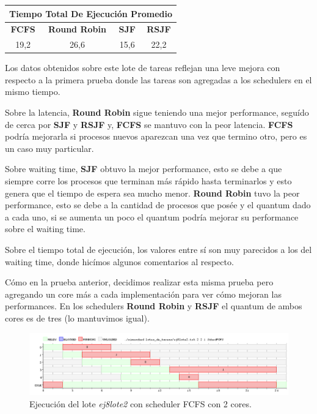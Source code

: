 \begin{center}
	\begin{tabular}{|c|c|c|c|}
		\hline
		\multicolumn{4}{|c|}{\large{\textbf{Tiempo Total De Ejecución Promedio}}} \\
		\hline
		\textbf{FCFS} & \textbf{Round Robin} & \textbf{SJF} & \textbf{RSJF} \\
		\hline
		19,2 & 26,6 & 15,6 & 22,2 \\
		\hline
	\end{tabular}
\end{center}

Los datos obtenidos sobre este lote de tareas reflejan una leve mejora con respecto a la primera prueba donde las tareas son agregadas a los schedulers en el mismo tiempo.

Sobre la latencia, \textbf{Round Robin} sigue teniendo una mejor performance, seguído de cerca por \textbf{SJF} y \textbf{RSJF} y, \textbf{FCFS} se mantuvo con la peor latencia. \textbf{FCFS} podría mejorarla si procesos nuevos aparezcan una vez que termino otro, pero es un caso muy particular.

Sobre waiting time, \textbf{SJF} obtuvo la mejor performance, esto se debe a que siempre corre los procesos que terminan más rápido hasta terminarlos y esto genera que el tiempo de espera sea mucho menor. \textbf{Round Robin} tuvo la peor performance, esto se debe a la cantidad de procesos que posée y el quantum dado a cada uno, si se aumenta un poco el quantum podría mejorar su performance sobre el waiting time.

Sobre el tiempo total de ejecución, los valores entre sí son muy parecidos a los del waiting time, donde hicímos algunos comentarios al respecto.

Cómo en la prueba anterior, decidimos realizar esta misma prueba pero agregando un core más a cada implementación para ver cómo mejoran las performances. En los schedulers \textbf{Round Robin} y \textbf{RSJF} el quantum de ambos cores es de tres (lo mantuvimos igual).

\begin{figure}[!h]
	\begin{center}
		\includegraphics[width=500px]{imagenes/ej8_prueba2_fcfs2.png}
		\caption{Ejecución del lote \emph{ej8lote2} con scheduler FCFS con 2 cores.}
		\label{fig:grafico_ej8_prueba2_fcfs2}
	\end{center}
\end{figure}

